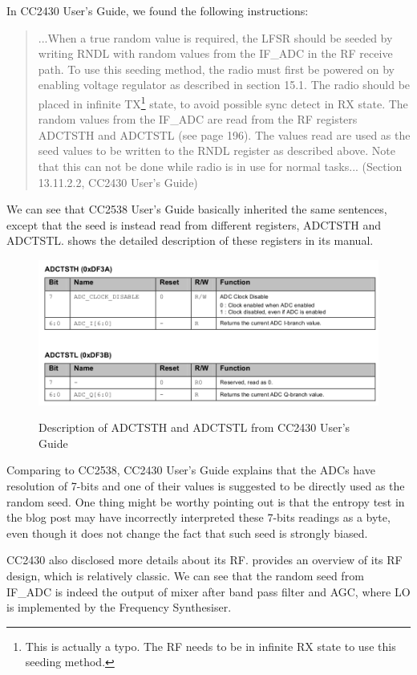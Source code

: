 In CC2430 User's Guide, we found the following instructions:
\begin{quote}
...When a true random value is required, the LFSR should be seeded by writing RNDL with random values from the IF\_ADC in the RF receive path. To use this seeding method, the radio must first be powered on by enabling voltage regulator as described in section 15.1. The radio should be placed in infinite TX\footnote{This is actually a typo. The RF needs to be in infinite RX state to use this seeding method.} state, to avoid possible sync detect in RX state. The random values from the IF\_ADC are read from the RF registers ADCTSTH and ADCTSTL (see page 196). The values read are used as the seed values to be written to the RNDL register as described above. Note that this can not be done while radio is in use for normal tasks... (Section 13.11.2.2, CC2430 User's Guide)
\end{quote}

We can see that CC2538 User's Guide basically inherited the same sentences, except that the seed is instead read from different registers, ADCTSTH and ADCTSTL.  shows the detailed description of these registers in its manual.

\begin{figure}
\center
\caption{Description of ADCTSTH and ADCTSTL from CC2430 User's Guide}
\includegraphics[width=\linewidth]{./figures/CC2430_ADCTST.png}
\label{CC2430_ADCTST}
\end{figure}

Comparing to CC2538, CC2430 User's Guide explains that the ADCs have resolution of 7-bits and one of their values is suggested to be directly used as the random seed. One thing might be worthy pointing out is that the entropy test in the blog post\cite{CC2430Fail} may have incorrectly interpreted these 7-bits readings as a byte, even though it does not change the fact that such seed is strongly biased.

CC2430 also disclosed more details about its RF.  provides an overview of its RF design, which is relatively classic. We can see that the random seed from IF\_ADC is indeed the output of mixer after band pass filter and AGC, where LO is implemented by the Frequency Synthesiser.

